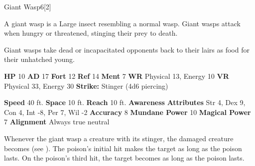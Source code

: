  \begin{monsection}{Giant Wasp}{6}[2]
    \vspace{-1em}\vspace{-1em}
    \vspace{0em}

    
        A giant wasp is a Large insect resembling a normal wasp.
        Giant wasps attack when hungry or threatened, stinging their prey to death.
      
        Giant wasps take dead or incapacitated opponents back to their lairs as food for their unhatched young.
      

    \begin{spellcontent}
      \begin{spelltargetinginfo}
        \pari \textbf{HP} 10 \monsep
          \textbf{AD} 17 \monsep
          \textbf{Fort} 12 \monsep
          \textbf{Ref} 14 \monsep
          \textbf{Ment} 7
        \pari \textbf{WR} Physical 13, Energy 10 \monsep
        \textbf{VR} Physical 33, Energy 30
        \pari \textbf{Strike:}
            Stinger  (4d6 piercing)
      \end{spelltargetinginfo}
    \end{spellcontent}
    \begin{monsterfooter}
      \pari \textbf{Speed} 40 ft. \monsep
        \textbf{Space} 10 ft. \monsep
        \textbf{Reach} 10 ft.
      \pari \textbf{Awareness} 
      \pari \textbf{Attributes}
        Str 4, Dex 9,
        Con 4, Int -8,
        Per 7, Wil -2
      \pari \textbf{Accuracy} 8 \monsep
        \textbf{Mundane Power} 10 \monsep
      \textbf{Magical Power} 7
      \pari \textbf{Alignment} Always true neutral
    \end{monsterfooter}
  \end{monsection}
          Whenever the giant wasp  a creature with its stinger,
            the damaged creature becomes  (see ).
          The poison's initial hit makes the target  as long as the poison lasts.
          On the poison's third hit, the target becomes  as long as the poison lasts.
  
